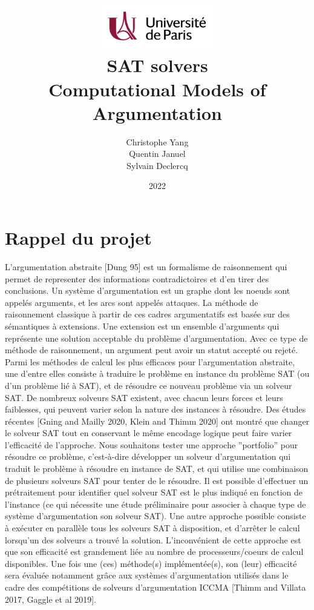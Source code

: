 \documentclass[11pt]{article}
\title{
	\centering
	\includegraphics[width=5cm]{univ-logo} \\
	\vspace{5cm}
	\textbf{SAT solvers} \\
	Computational Models of Argumentation
	\vspace{5cm}
}
\author{
    Christophe Yang \\
    Quentin Januel \\
    Sylvain Declercq
}
\date{2022}
\begin{document}
\maketitle
\newpage
\section{Rappel du projet}
L’argumentation abstraite [Dung 95] est un formalisme de raisonnement qui permet de representer des
informations contradictoires et d’en tirer des conclusions.
Un système d’argumentation est un graphe
dont les noeuds sont appelés arguments, et les arcs sont appelés attaques. La méthode de raisonnement
classique à partir de ces cadres argumentatifs est basée sur des sémantiques à extensions. Une extension
est un ensemble d’arguments qui représente une solution acceptable du problème d’argumentation. Avec
ce type de méthode de raisonnement, un argument peut avoir un statut accepté ou rejeté. Parmi les
méthodes de calcul les plus efficaces pour l’argumentation abstraite, une d’entre elles consiste à traduire
le problème en instance du problème SAT (ou d’un problème lié à SAT), et de résoudre ce nouveau
problème via un solveur SAT. De nombreux solveurs SAT existent, avec chacun leurs forces et leurs
faiblesses, qui peuvent varier selon la nature des instances à résoudre. Des études récentes [Gning and
Mailly 2020, Klein and Thimm 2020] ont montré que changer le solveur SAT tout en conservant le même
encodage logique peut faire varier l’efficacité de l’approche.
\bigbreak
Nous souhaitons tester une approche ”portfolio” pour résoudre ce problème, c’est-à-dire développer un
solveur d’argumentation qui traduit le problème à résoudre en instance de SAT, et qui utilise une
combinaison de plusieurs solveurs SAT pour tenter de le résoudre. Il est possible d’effectuer un prétraitement 
pour identifier quel solveur SAT est le plus indiqué en fonction de l’instance (ce qui nécessite
une étude préliminaire pour associer à chaque type de système d'argumentation son solveur SAT). Une
autre approche possible consiste à exécuter en parallèle tous les solveurs SAT à disposition, et d’arrêter le
calcul lorsqu’un des solveurs a trouvé la solution. L’inconvénient de cette approche est que son efficacité
est grandement liée au nombre de processeurs/coeurs de calcul disponibles.
Une fois une (ces) méthode(s) implémentée(s), son (leur) efficacité sera évaluée notamment grâce aux
systèmes d’argumentation utilisés dans le cadre des compétitions de solveurs d’argumentation ICCMA
[Thimm and Villata 2017, Gaggle et al 2019].
\end{document}
